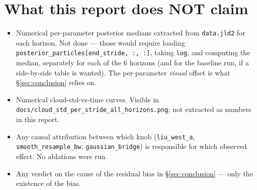 \documentclass[11pt,a4paper]{article}
\begin{document}
\section{What this report does NOT claim}
\label{sec:not_claimed}

\begin{itemize}[itemsep=2pt]
  \item Numerical per-parameter posterior medians extracted from
        \texttt{data.jld2} for each horizon. Not done — those would
        require loading
        \texttt{posterior\_particles[end\_stride, :, :]}, taking
        \texttt{log}, and computing the median, separately for each
        of the 6 horizons (and for the baseline run, if a
        side-by-side table is wanted). The per-parameter \emph{visual}
        offset is what \S\ref{sec:conclusion} relies on.
  \item Numerical cloud-std-vs-time curves. Visible in
        \texttt{docs/cloud\_std\_per\_stride\_all\_horizons.png}; not
        extracted as numbers in this report.
  \item Any causal attribution between which knob (\texttt{liu\_west\_a},
        \texttt{smooth\_resample\_bw}, \texttt{gaussian\_bridge}) is
        responsible for which observed effect. No ablations were run.
  \item Any verdict on the cause of the residual bias in
        \S\ref{sec:conclusion} — only the existence of the bias.
\end{itemize}
\end{document}
